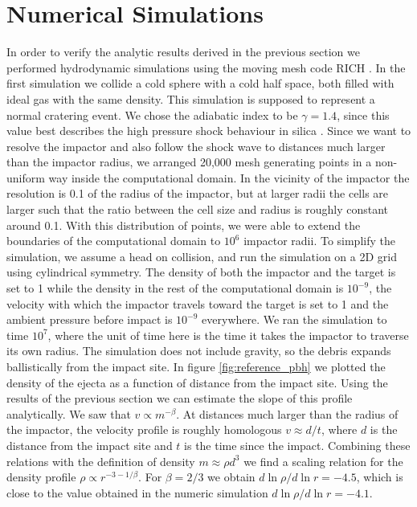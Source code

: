 \documentclass[usenatbib]{mnras}
\begin{document}
\section{Numerical Simulations} \label{sec:sims}

In order to verify the analytic results derived in the previous section we performed hydrodynamic simulations using the moving mesh code RICH \citep{Yalinewich2015Rich:Mesh}. In the first simulation we collide a cold sphere with a cold half space, both filled with ideal gas with the same density. This simulation is supposed to represent a normal cratering event. We chose the adiabatic index to be $\gamma=1.4$, since this value best describes the high pressure shock behaviour in silica \citep{Yalinewich2019AtmosphericImpacts}. Since we want to resolve the impactor and also follow the shock wave to distances much larger than the impactor radius, we arranged 20,000 mesh generating points in a non-uniform way inside the computational domain. In the vicinity of the impactor the resolution is 0.1 of the radius of the impactor, but at larger radii the cells are larger such that the ratio between the cell size and radius is roughly constant around 0.1. With this distribution of points, we were able to extend the boundaries of the computational domain to $10^6$ impactor radii. To simplify the simulation, we assume a head on collision, and run the simulation on a 2D grid using cylindrical symmetry. The density of both the impactor and the target is set to 1 while the density in the rest of the computational domain is $10^{-9}$, the velocity with which the impactor travels toward the target is set to 1 and the ambient pressure before impact is $10^{-9}$ everywhere. We ran the simulation to time $10^7$, where the unit of time here is the time it takes the impactor to traverse its own radius. The simulation does not include gravity, so the debris expands ballistically from the impact site. In figure \ref{fig:reference_pbh} we plotted the density of the ejecta as a function of distance from the impact site. Using the results of the previous section we can estimate the slope of this profile analytically. We saw that $v \propto m^{-\beta}$. At distances much larger than the radius of the impactor, the velocity profile is roughly homologous $v \approx d/t$, where $d$ is the distance from the impact site and $t$ is the time since the impact. Combining these relations with the definition of density $m \approx \rho d^3$ we find a scaling relation for the density profile $\rho \propto r^{-3 -1/\beta}$. For $\beta = 2/3$ we obtain $d \ln \rho / d \ln r = -4.5$, which is close to the value obtained in the numeric simulation $d \ln \rho / d \ln r = -4.1$.
\end{document}
